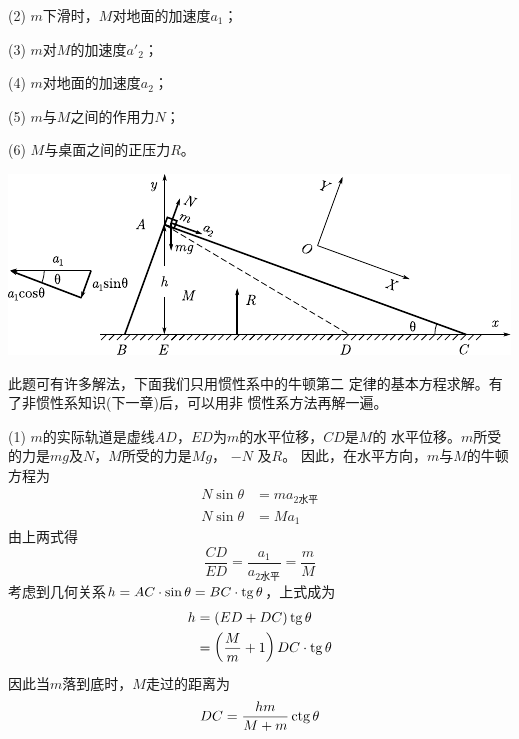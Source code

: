 (2) $ m $下滑时，$ M $对地面的加速度$ a_1 $；

(3) $ m $对$ M $的加速度$ a'_2 $；

(4) $ m $对地面的加速度$ a_2$；

(5) $ m $与$ M  $之间的作用力$  N $；

(6) $ M $与桌面之间的正压力$ R $。
\begin{figurex}
	\centering
	\includegraphics{figure/fig03.16}
	\caption{}
	\label{fig:03.16}
\end{figurex}

\solution 此题可有许多解法，下面我们只用惯性系中的牛顿第二
定律的基本方程求解。有了非惯性系知识(下一章)后，可以用非
惯性系方法再解一遍。

(1) $ m $的实际轨道是虚线$ AD $，$ ED $为$ m $的水平位移，$ CD $是$ M $的
水平位移。$ m $所受的力是$ mg $及$ N $，$ M $所受的力是$  M g  $， $ - N $ 及$ R $。
因此，在水平方向，$ m $与$ M $的牛顿方程为
\begin{align*}
    N \sin \theta &= m a _ { 2\text{水平} } \\
    N \sin \theta &= M a _ { 1 }
\end{align*}
由上两式得
\begin{equation*}
    \frac { C D } { E D } = \frac { a _ { 1 } } { a _ { 2\text{水平}}} = \frac { m } { M }
\end{equation*}
考虑到几何关系$  h = AC \cdot \sin \theta = BC \cdot \operatorname{tg} \theta  $，上式成为
\begin{align*}
    h &= \left( E D + D C \right) \operatorname{tg} \theta \\
    &= \left( \frac { M } { m } + 1 \right) D C \cdot \operatorname{tg} \theta
\end{align*}
因此当$ m $落到底时，$ M $走过的距离为
\begin{equation*}
    D C = \frac { h m } { M + m } \operatorname{ctg} \theta
\end{equation*}


